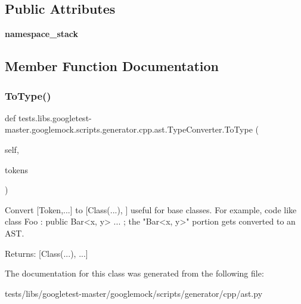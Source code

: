 \subsection*{Public Attributes}
\begin{DoxyCompactItemize}
\item 
\mbox{\label{classtests_1_1libs_1_1googletest-master_1_1googlemock_1_1scripts_1_1generator_1_1cpp_1_1ast_1_1TypeConverter_a7a4121db9f133351e368180bc45075a8}} 
{\bfseries namespace\+\_\+stack}
\end{DoxyCompactItemize}


\subsection{Member Function Documentation}
\mbox{\label{classtests_1_1libs_1_1googletest-master_1_1googlemock_1_1scripts_1_1generator_1_1cpp_1_1ast_1_1TypeConverter_a84ef2b87afae1d0535b310be2675148f}} 
\subsubsection{\texorpdfstring{To\+Type()}{ToType()}}
{\footnotesize\ttfamily def tests.\+libs.\+googletest-\/master.\+googlemock.\+scripts.\+generator.\+cpp.\+ast.\+Type\+Converter.\+To\+Type (\begin{DoxyParamCaption}\item[{}]{self,  }\item[{}]{tokens }\end{DoxyParamCaption})}

\begin{DoxyVerb}Convert [Token,...] to [Class(...), ] useful for base classes.
For example, code like class Foo : public Bar<x, y> { ... };
the "Bar<x, y>" portion gets converted to an AST.

Returns:
  [Class(...), ...]
\end{DoxyVerb}
 

The documentation for this class was generated from the following file\+:\begin{DoxyCompactItemize}
\item 
tests/libs/googletest-\/master/googlemock/scripts/generator/cpp/ast.\+py\end{DoxyCompactItemize}
